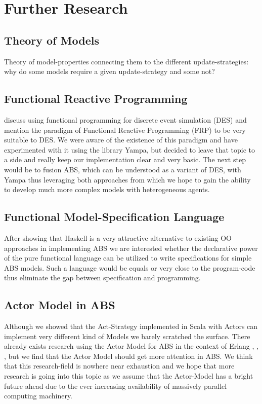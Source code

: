 \section{Further Research}

\subsection{Theory of Models}
Theory of model-properties connecting them to the different update-strategies: why do some models require a given update-strategy and some not?

\subsection{Functional Reactive Programming}
\cite{jankovic_functional_2007} discuss using functional programming for discrete event simulation (DES) and mention the paradigm of Functional Reactive Programming (FRP) to be very suitable to DES. We were aware of the existence of this paradigm and have experimented with it using the library Yampa, but decided to leave that topic to a side and really keep our implementation clear and very basic. The next step would be to fusion ABS, which can be understood as a variant of DES, with Yampa thus leveraging both approaches from which we hope to gain the ability to develop much more complex models with heterogeneous agents.

\subsection{Functional Model-Specification Language}
After showing that Haskell is a very attractive alternative to existing OO approaches in implementing ABS we are interested whether the declarative power of the pure functional language can be utilized to write specifications for simple ABS models. Such a language would be equals or very close to the program-code thus eliminate the gap between specification and programming.

\subsection{Actor Model in ABS}
Although we showed that the Act-Strategy implemented in Scala with Actors can implement very different kind of Models we barely scratched the surface. There already exists research using the Actor Model for ABS in the context of Erlang \cite{varela_modelling_2004}, \cite{di_stefano_using_2005}, \cite{di_stefano_exat:_2007}, \cite{sher_agent-based_2013} but we find that the Actor Model should get more attention in ABS. We think that this research-field is nowhere near exhaustion and we hope that more research is going into this topic as we assume that the Actor-Model has a bright future ahead due to the ever increasing availability of massively parallel computing machinery.